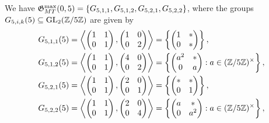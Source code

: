 We have $\mathfrak{G}_{MT}^{\max}(0,5) = \{ G_{5,1,1}, G_{5,1,2}, G_{5,2,1}, G_{5,2,2} \}$, where the groups $G_{5,i,k}(5) \subseteq \operatorname{GL}_2(\mathbb{Z}/5\mathbb{Z})$ are given by
\[
\begin{split}
G_{5,1,1}(5) &= \left\langle \begin{pmatrix} 1 & 1 \\ 0 & 1 \end{pmatrix}, \begin{pmatrix} 1 & 0 \\ 0 & 2 \end{pmatrix} \right\rangle = \left\{ \begin{pmatrix} 1 & * \\ 0 & * \end{pmatrix} \right\}, \\
G_{5,1,2}(5) &= \left\langle \begin{pmatrix} 1 & 1 \\ 0 & 1 \end{pmatrix}, \begin{pmatrix} 4 & 0 \\ 0 & 2 \end{pmatrix} \right\rangle = \left\{ \begin{pmatrix} a^2 & * \\ 0 & a \end{pmatrix} : a \in (\mathbb{Z}/5\mathbb{Z})^\times \right\}, \\
G_{5,2,1}(5) &= \left\langle \begin{pmatrix} 1 & 1 \\ 0 & 1 \end{pmatrix}, \begin{pmatrix} 2 & 0 \\ 0 & 1 \end{pmatrix} \right\rangle = \left\{ \begin{pmatrix} * & * \\ 0 & 1 \end{pmatrix} \right\}, \\
G_{5,2,2}(5) &= \left\langle \begin{pmatrix} 1 & 1 \\ 0 & 1 \end{pmatrix}, \begin{pmatrix} 2 & 0 \\ 0 & 4 \end{pmatrix} \right\rangle = \left\{ \begin{pmatrix} a & * \\ 0 & a^2 \end{pmatrix} : a \in (\mathbb{Z}/5\mathbb{Z})^\times \right\},
\end{split}
\]
